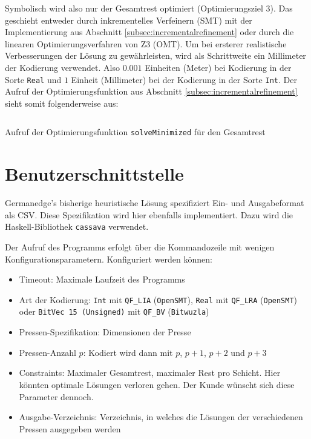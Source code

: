Symbolisch wird also nur der Gesamtrest optimiert (Optimierungsziel 3).
Das geschieht entweder durch inkrementelles Verfeinern (SMT) mit der Implementierung aus Abschnitt \ref{subsec:incrementalrefinement} oder durch
die linearen Optimierungsverfahren von Z3 (OMT).
Um bei ersterer realistische Verbesserungen der Lösung zu gewährleisten, wird als Schrittweite ein Millimeter der Kodierung verwendet.
Also $0.001$ Einheiten (Meter) bei Kodierung in der Sorte \texttt{Real} und $1$ Einheit (Millimeter) bei der Kodierung in der Sorte \texttt{Int}.
Der Aufruf der Optimierungsfunktion aus Abschnitt \ref{subsec:incrementalrefinement} sieht somit folgenderweise aus:

\begin{listing}[H]
    \inputminted[linenos=true]{haskell}{Code/Implementierung/OptimizationTotalWaste.hs}
    \caption{Aufruf der Optimierungsfunktion \texttt{solveMinimized} für den Gesamtrest}
    \label{listing:solveminimized}
\end{listing}

\section{Benutzerschnittstelle}
Germanedge's bisherige heuristische Lösung spezifiziert Ein- und Ausgabeformat als CSV.
Diese Spezifikation wird hier ebenfalls implementiert.
Dazu wird die Haskell-Bibliothek \texttt{cassava} \cite{cassava} verwendet.

Der Aufruf des Programms erfolgt über die Kommandozeile mit wenigen Konfigurationsparametern.
Konfiguriert werden können:

\begin{itemize}
    \item Timeout: Maximale Laufzeit des Programms
    \item Art der Kodierung: \texttt{Int} mit \texttt{QF\_LIA} (\texttt{OpenSMT}), \texttt{Real} mit \texttt{QF\_LRA} (\texttt{OpenSMT}) oder \texttt{BitVec 15 (Unsigned)} mit \texttt{QF\_BV} (\texttt{Bitwuzla})
    \item Pressen-Spezifikation: Dimensionen der Presse
    \item Pressen-Anzahl $p$: Kodiert wird dann mit $p$, $p+1$, $p+2$ und $p+3$
    \item Constraints: Maximaler Gesamtrest, maximaler Rest pro Schicht. Hier könnten optimale Lösungen verloren gehen. Der Kunde wünscht sich diese Parameter dennoch.
    \item Ausgabe-Verzeichnis: Verzeichnis, in welches die Lösungen der verschiedenen Pressen ausgegeben werden
\end{itemize}
